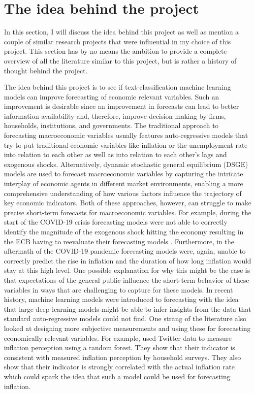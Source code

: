 \documentclass[11pt, a4paper, leqno]{article}
\begin{document}
\section{The idea behind the project}
In this section, I will discuss the idea behind this project as well as mention a couple of similar research projects that were influential in my choice of this project. This section has by no means the ambition to provide a complete overview of all the literature similar to this project, but is rather a history of thought behind the project.

The idea behind this project is to see if text-classification machine learning models can improve forecasting of economic relevant variables. Such an improvement is desirable since an improvement in forecasts can lead to better information availability and, therefore, improve decision-making by firms, households, institutions, and governments. The traditional approach to forecasting macroeconomic variables usually features auto-regressive models that try to put traditional economic variables like inflation or the unemployment rate into relation to each other as well as into relation to each other's lags and exogenous shocks. Alternatively, dynamic stochastic general equilibrium (DSGE) models are used to forecast macroeconomic variables by capturing the intricate interplay of economic agents in different market environments, enabling a more comprehensive understanding of how various factors influence the trajectory of key economic indicators. Both of these approaches, however, can struggle to make precise short-term forecasts for macroeconomic variables. For example, during the start of the COVID-19 crisis forecasting models were not able to correctly identify the magnitude of the exogenous shock hitting the economy resulting in the ECB having to reevaluate their forecasting models \parencite{EconomicBulletin}. Furthermore, in the aftermath of the COVID-19 pandemic forecasting models were, again, unable to correctly predict the rise in inflation and the duration of how long inflation would stay at this high level. One possible explanation for why this might be the case is that expectations of the general public influence the short-term behavior of these variables in ways that are challenging to capture for these models.
In recent history, machine learning models were introduced to forecasting with the idea that large deep learning models might be able to infer insights from the data that standard auto-regressive models could not find. One strang of the literature also looked at designing more subjective measurements and using these for forecasting economically relevant variables. For example, \textcite{BIS} used Twitter data to measure inflation perception using a random forest. They show that their indicator is consistent with measured inflation perception by household surveys. They also show that their indicator is strongly correlated with the actual inflation rate which could spark the idea that such a model could be used for forecasting inflation.
\end{document}
